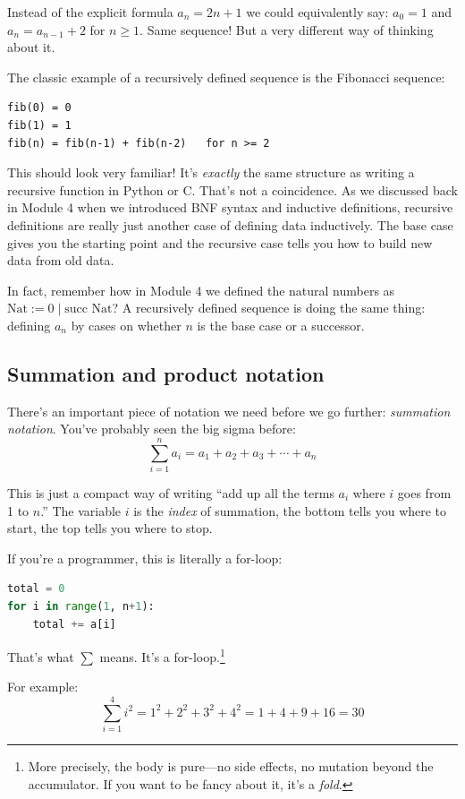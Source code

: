 \documentclass[11pt]{article}
\begin{document}
Instead of the explicit formula $a_n = 2n+1$ we could equivalently say: $a_0 = 1$ and $a_n = a_{n-1} + 2$ for $n \geq 1$. Same sequence! But a very different way of thinking about it.

The classic example of a recursively defined sequence is the Fibonacci sequence:
\begin{lstlisting}
fib(0) = 0
fib(1) = 1
fib(n) = fib(n-1) + fib(n-2)   for n >= 2
\end{lstlisting}

This should look very familiar! It's \emph{exactly} the same structure as writing a recursive function in Python or C. That's not a coincidence. As we discussed back in Module 4 when we introduced BNF syntax and inductive definitions, recursive definitions are really just another case of defining data inductively. The base case gives you the starting point and the recursive case tells you how to build new data from old data.

In fact, remember how in Module 4 we defined the natural numbers as $\text{Nat} := 0 \mid \text{succ Nat}$? A recursively defined sequence is doing the same thing: defining $a_n$ by cases on whether $n$ is the base case or a successor.

\subsection{Summation and product notation}
There's an important piece of notation we need before we go further: \emph{summation notation}. You've probably seen the big sigma before:
\[
\sum_{i=1}^{n} a_i = a_1 + a_2 + a_3 + \cdots + a_n
\]

This is just a compact way of writing ``add up all the terms $a_i$ where $i$ goes from 1 to $n$.'' The variable $i$ is the \emph{index} of summation, the bottom tells you where to start, the top tells you where to stop.

If you're a programmer, this is literally a for-loop:
\begin{lstlisting}[language=Python]
total = 0
for i in range(1, n+1):
    total += a[i]
\end{lstlisting}

That's what $\sum$ means. It's a for-loop.\footnote{More precisely, the body is pure---no side effects, no mutation beyond the accumulator. If you want to be fancy about it, it's a \emph{fold}.}

For example:
\[
\sum_{i=1}^{4} i^2 = 1^2 + 2^2 + 3^2 + 4^2 = 1 + 4 + 9 + 16 = 30
\]
\end{document}
